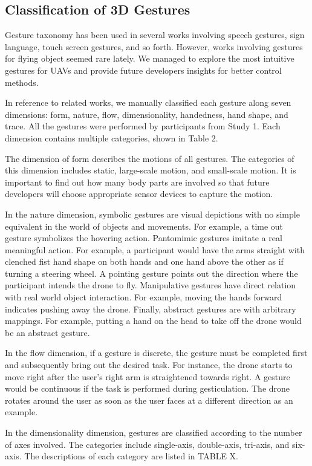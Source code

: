\documentclass{sigchi}
\begin{document}
\subsection{Classification of 3D Gestures}
Gesture taxonomy has been used in several works involving speech gestures, sign language, touch screen gestures, and so forth. However, works involving gestures for flying object seemed rare lately. We managed to explore the most intuitive gestures for UAVs and provide future developers insights for better control methods.

In reference to related works, we manually classified each gesture along seven dimensions: form, nature, flow, dimensionality, handedness, hand shape, and trace. All the gestures were performed by participants from Study 1. Each dimension contains multiple categories, shown in Table 2.

The dimension of form describes the motions of all gestures. The categories of this dimension includes static, large-scale motion, and small-scale motion. It is important to find out how many body parts are involved so that future developers will choose appropriate sensor devices to capture the motion.

In the nature dimension, symbolic gestures are visual depictions with no simple equivalent in the world of objects and movements. For example, a time out gesture symbolizes the hovering action. Pantomimic gestures imitate a real meaningful action. For example, a participant would have the arms straight with clenched fist hand shape on both hands and one hand above the other as if turning a steering wheel. A pointing gesture points out the direction where the participant intends the drone to fly. Manipulative gestures have direct relation with real world object interaction. For example, moving the hands forward indicates pushing away the drone. Finally, abstract gestures are with arbitrary mappings. For example, putting a hand on the head to take off the drone would be an abstract gesture.

In the flow dimension, if a gesture is discrete, the gesture must be completed first and subsequently bring out the desired task. For instance, the drone starts to move right after the user's right arm is straightened towards right. A gesture would be continuous if the task is performed during gesticulation. The drone rotates around the user as soon as the user faces at a different direction as an example.

In the dimensionality dimension, gestures are classified according to the number of axes involved. The categories include single-axis, double-axis, tri-axis, and six-axis. The descriptions of each category are listed in TABLE X.
\end{document}
